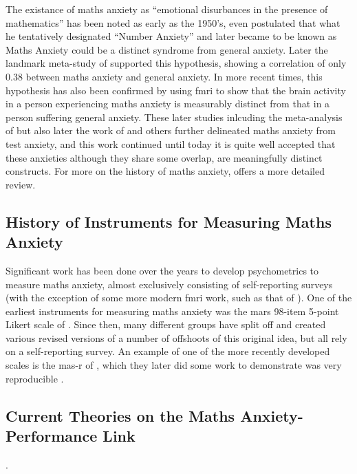 \documentclass[14pt]{memoir}
\begin{document}
The existance of maths anxiety as ``emotional disurbances in the presence of mathematics'' has been noted as early as the 1950's,  even postulated that what he tentatively designated ``Number Anxiety'' and later became to be known as Maths Anxiety could be a distinct syndrome from general anxiety. Later the landmark meta-study of  supported this hypothesis, showing a correlation of only $0.38$ between maths anxiety and general anxiety. In more recent times, this hypothesis has also been confirmed by  using \gls{fmri} to show that the brain activity in a person experiencing maths anxiety is measurably distinct from that in a person suffering general anxiety. These later studies inlcuding the meta-analysis of  but also later the work of  and others further delineated maths anxiety from test anxiety, and this work continued until today it is quite well accepted that these anxieties although they share some overlap, are meaningfully distinct constructs. For more on the history of maths anxiety,  offers a more detailed review.

\subsection*{History of Instruments for Measuring Maths Anxiety}

Significant work has been done over the years to develop psychometrics to measure maths anxiety, almost exclusively consisting of self-reporting surveys (with the exception of some more modern \gls{fmri} work, such as that of ). One of the earliest instruments for measuring maths anxiety was the \gls{mars} 98-item 5-point Likert scale of . Since then, many different groups have split off and created various revised versions of a number of offshoots of this original idea, but all rely on a self-reporting survey. An example of one of the more recently developed scales is the \gls{mas-r} of , which they later did some work to demonstrate was very reproducible \cite{Bai2011}.

\subsection*{Current Theories on the Maths Anxiety-Performance Link}.
\end{document}
